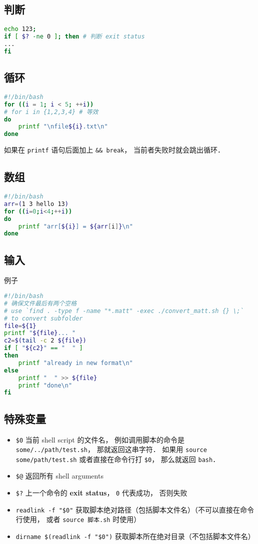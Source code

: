 \subsection{判断}
\begin{lstlisting}[language=bash]
echo 123;
if [ $? -ne 0 ]; then # 判断 exit status
...
fi
\end{lstlisting}

\subsection{循环}
\begin{lstlisting}[language=bash]
#!/bin/bash
for ((i = 1; i < 5; ++i))
# for i in {1,2,3,4} # 等效
do
	printf "\nfile${i}.txt\n"
done
\end{lstlisting}
如果在 \verb|printf| 语句后面加上 \verb|&& break|， 当前者失败时就会跳出循环．

\subsection{数组}
\begin{lstlisting}[language=bash]
#!/bin/bash
arr=(1 3 hello 13)
for ((i=0;i<4;++i))
do
    printf "arr[${i}] = ${arr[i]}\n"
done
\end{lstlisting}


\subsection{输入}
例子
\begin{lstlisting}[language=bash]
#!/bin/bash
# 确保文件最后有两个空格
# use `find . -type f -name "*.matt" -exec ./convert_matt.sh {} \;`
# to convert subfolder
file=${1}
printf "${file}... "
c2=$(tail -c 2 ${file})
if [ "${c2}" == "  " ]
then
	printf "already in new format\n"
else
	printf "  " >> ${file}
	printf "done\n"
fi
\end{lstlisting}

\subsection{特殊变量}
\begin{itemize}
\item \verb`$0` 当前 shell script 的文件名， 例如调用脚本的命令是 \verb|some/../path/test.sh|， 那就返回这串字符． 如果用 \verb|source some/path/test.sh| 或者直接在命令行打 \verb|$0|， 那么就返回 \verb|bash|．
\item \verb`$@` 返回所有 shell arguments
\item \verb|$?| 上一个命令的 \textbf{exit status}， \verb|0| 代表成功， 否则失败
\item \verb|readlink -f "$0"| 获取脚本绝对路径（包括脚本文件名）（不可以直接在命令行使用， 或者 \verb|source 脚本.sh| 时使用）
\item \verb|dirname $(readlink -f "$0")| 获取脚本所在绝对目录（不包括脚本文件名）
\end{itemize}

